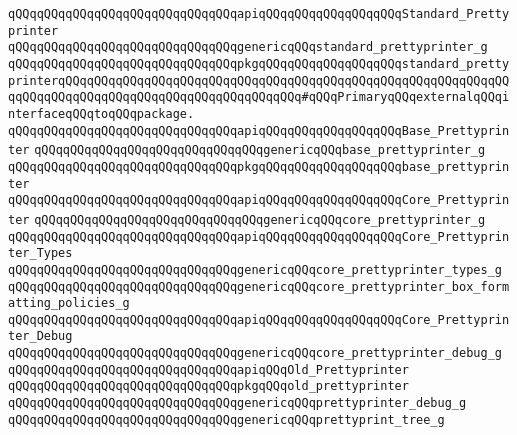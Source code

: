 \verb|qQQqqQQqqQQqqQQqqQQqqQQqqQQqqQQqapiqQQqqQQqqQQqqQQqqQQqStandard_Prettyprinter|\newline
\verb|qQQqqQQqqQQqqQQqqQQqqQQqqQQqqQQqgenericqQQqstandard_prettyprinter_g|\newline
\verb|qQQqqQQqqQQqqQQqqQQqqQQqqQQqqQQqpkgqQQqqQQqqQQqqQQqqQQqstandard_prettyprinterqQQqqQQqqQQqqQQqqQQqqQQqqQQqqQQqqQQqqQQqqQQqqQQqqQQqqQQqqQQqqQQqqQQqqQQqqQQqqQQqqQQqqQQqqQQqqQQqqQQqqQQq#qQQqPrimaryqQQqexternalqQQqinterfaceqQQqtoqQQqpackage.|\newline
\newline
\verb|qQQqqQQqqQQqqQQqqQQqqQQqqQQqqQQqapiqQQqqQQqqQQqqQQqqQQqBase_Prettyprinter|\newline
\verb|qQQqqQQqqQQqqQQqqQQqqQQqqQQqqQQqgenericqQQqbase_prettyprinter_g|\newline
\verb|qQQqqQQqqQQqqQQqqQQqqQQqqQQqqQQqpkgqQQqqQQqqQQqqQQqqQQqbase_prettyprinter|\newline
\newline
\verb|qQQqqQQqqQQqqQQqqQQqqQQqqQQqqQQqapiqQQqqQQqqQQqqQQqqQQqCore_Prettyprinter|\newline
\verb|qQQqqQQqqQQqqQQqqQQqqQQqqQQqqQQqgenericqQQqcore_prettyprinter_g|\newline
\newline
\verb|qQQqqQQqqQQqqQQqqQQqqQQqqQQqqQQqapiqQQqqQQqqQQqqQQqqQQqCore_Prettyprinter_Types|\newline
\verb|qQQqqQQqqQQqqQQqqQQqqQQqqQQqqQQqgenericqQQqcore_prettyprinter_types_g|\newline
\newline
\verb|qQQqqQQqqQQqqQQqqQQqqQQqqQQqqQQqgenericqQQqcore_prettyprinter_box_formatting_policies_g|\newline
\newline
\verb|qQQqqQQqqQQqqQQqqQQqqQQqqQQqqQQqapiqQQqqQQqqQQqqQQqqQQqCore_Prettyprinter_Debug|\newline
\verb|qQQqqQQqqQQqqQQqqQQqqQQqqQQqqQQqgenericqQQqcore_prettyprinter_debug_g|\newline
\newline
\verb|qQQqqQQqqQQqqQQqqQQqqQQqqQQqqQQqapiqQQqOld_Prettyprinter|\newline
\verb|qQQqqQQqqQQqqQQqqQQqqQQqqQQqqQQqpkgqQQqold_prettyprinter|\newline
\newline
\verb|qQQqqQQqqQQqqQQqqQQqqQQqqQQqqQQqgenericqQQqprettyprinter_debug_g|\newline
\verb|qQQqqQQqqQQqqQQqqQQqqQQqqQQqqQQqgenericqQQqprettyprint_tree_g|\newline
